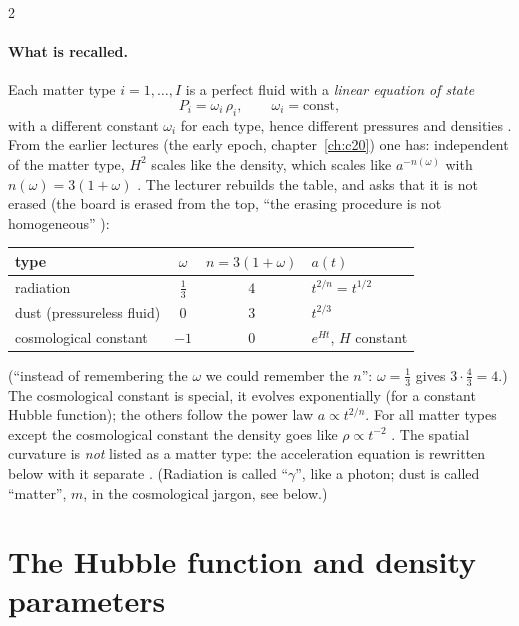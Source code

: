\begin{paracol}{2}
\paragraph{What is recalled.} Each matter type $i=1,\dots,I$ is a perfect fluid with a \emph{linear equation of state}
\[
  P_i=\omega_i\,\rho_i,\qquad \omega_i=\text{const},
\]
with a different constant $\omega_i$ for each type, hence different pressures and densities . From the earlier lectures (the early epoch, chapter~\ref{ch:c20}) one has: independent of the matter type, $H^2$ scales like the density, which scales like $a^{-n(\omega)}$ with $n(\omega)=3(1+\omega)$ . The lecturer rebuilds the table, and asks that it is not erased (the board is erased from the top, ``the erasing procedure is not homogeneous'' ):

\begin{center}
\renewcommand{\arraystretch}{1.35}
\begin{tabular}{@{}l c c l@{}}
\toprule
\textbf{type} & $\omega$ & $n=3(1+\omega)$ & $a(t)$\\
\midrule
radiation & $\tfrac13$ & $4$ & $t^{2/n}=t^{1/2}$\\
dust (pressureless fluid) & $0$ & $3$ & $t^{2/3}$\\
cosmological constant & $-1$ & $0$ & $e^{Ht}$, $H$ constant\\
\bottomrule
\end{tabular}
\end{center}
(``instead of remembering the $\omega$ we could remember the $n$'': $\omega=\tfrac13$ gives $3\cdot\tfrac43=4$.) The cosmological constant is special, it evolves exponentially (for a constant Hubble function); the others follow the power law $a\propto t^{2/n}$. For all matter types except the cosmological constant the density goes like $\rho\propto t^{-2}$ . The spatial curvature is \emph{not} listed as a matter type: the acceleration equation is rewritten below with it separate . (Radiation is called ``$\gamma$'', like a photon; dust is called ``matter'', $m$, in the cosmological jargon, see below.)

\section{The Hubble function and density parameters}\label{sec:c21-hubble}


\end{paracol}
